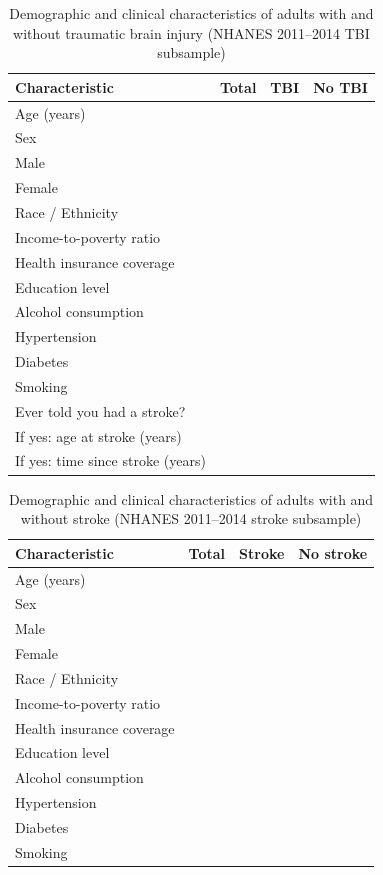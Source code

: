 \documentclass{article}
\begin{document}
\begin{table}[htbp]
\centering
\caption{Demographic and clinical characteristics of adults with and without traumatic brain injury (NHANES 2011--2014 TBI subsample)}
\label{tab:demographics-tbi}
\begin{tabular}{lccc}
\hline
\textbf{Characteristic} & \textbf{Total} & \textbf{TBI} & \textbf{No TBI} \\
\hline
Age (years) & & & \\
Sex & & & \\
\quad Male & & & \\
\quad Female & & & \\
Race / Ethnicity & & & \\
Income-to-poverty ratio & & & \\
Health insurance coverage & & & \\
Education level & & & \\
Alcohol consumption & & & \\
Hypertension & & & \\
Diabetes & & & \\
Smoking & & & \\
Ever told you had a stroke? & & & \\
If yes: age at stroke (years) & & & \\
If yes: time since stroke (years) & & & \\
\hline
\end{tabular}
\end{table}

\begin{table}[htbp]
\centering
\caption{Demographic and clinical characteristics of adults with and without stroke (NHANES 2011--2014 stroke subsample)}
\label{tab:demographics-stroke}
\begin{tabular}{lccc}
\hline
\textbf{Characteristic} & \textbf{Total} & \textbf{Stroke} & \textbf{No stroke} \\
\hline
Age (years) & & & \\
Sex & & & \\
\quad Male & & & \\
\quad Female & & & \\
Race / Ethnicity & & & \\
Income-to-poverty ratio & & & \\
Health insurance coverage & & & \\
Education level & & & \\
Alcohol consumption & & & \\
Hypertension & & & \\
Diabetes & & & \\
Smoking & & & \\
\hline
\end{tabular}
\end{table}
\end{document}
